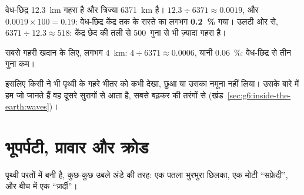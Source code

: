 \begin{example}\label{ex:g6:inside-the-earth:kola}
वेध-छिद्र 12.3~km गहरा है और त्रिज्या 6371~km है।
$12.3 \div 6371 \approx 0.0019$, और $0.0019 \times 100 = 0.19$: वेध-छिद्र
केंद्र तक के रास्ते का लगभग \textbf{0.2~\%} गया। उलटी
ओर से, $6371 \div 12.3 \approx 518$: केंद्र छेद की तली से 500~गुना से भी
ज़्यादा गहरा है।

सबसे गहरी खदान के लिए, लगभग 4~km: $4 \div 6371 \approx 0.0006$, यानी
0.06~\%: वेध-छिद्र से तीन गुना कम।
\end{example}

इसलिए किसी ने भी पृथ्वी के गहरे भीतर को कभी देखा, छुआ या उसका नमूना नहीं लिया।
उसके बारे में हम जो जानते हैं वह दूसरे सुरागों से आता है, सबसे बढ़कर  की
तरंगों से (खंड~\ref{sec:g6:inside-the-earth:waves})।

\section{भूपर्पटी, प्रावार और क्रोड}

पृथ्वी परतों में बनी है, कुछ-कुछ उबले अंडे की तरह: एक पतला भुरभुरा
छिलका, एक मोटी ``सफ़ेदी'', और बीच में एक ``ज़र्दी''।

